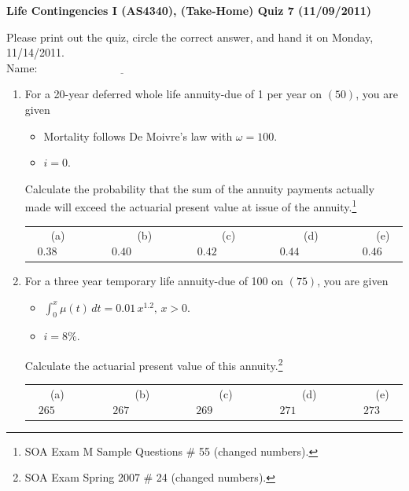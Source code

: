 \documentclass[11pt,fleqn,oneside]{book}
\begin{document}
\thispagestyle{empty}
\setcounter{page}{1}
\begin{center}
{ \large \bf Life Contingencies I (AS4340), (Take-Home) Quiz 7 (11/09/2011)}
\end{center}
\noindent
Please print out the quiz, circle the correct answer, and hand it on Monday, 11/14/2011.\\
Name: $\underline{\;\;\;\;\;\;\;\;\;\;\;\;\;\;\;\;\;\;\;\;\;\;\;\;\;\;\;\;\;\;\;\;\;\;\;\;\;\;\;\;\;\;\;\;\;\;\;\;\;\;\;\;\;}$
\begin{enumerate}

\item For a 20-year deferred whole life annuity-due of 1 per year on $(50)$, you are given
\begin{itemize}
\item Mortality follows De Moivre's law with $\omega = 100$.
\item $i=0$.
\end{itemize}
Calculate the probability that the sum of the annuity payments actually made will exceed the actuarial present value at issue of the annuity.\footnote[1]{SOA Exam M Sample Questions \# 55 (changed numbers).}

\begin{center}
\small
\begin{tabular}{c c c c c}
(a) $0.38\;\;\;\;\;\;\;$ & 
$\;\;\;\;\;\;\;$(b) $0.40\;\;\;\;\;\;\;\;$ &
$\;\;\;\;\;\;\;$(c) $0.42\;\;\;\;\;\;\;$ & 
$\;\;\;\;\;\;\;$(d) $0.44\;\;\;\;\;\;\;$ &
$\;\;\;\;\;\;\;$(e) $0.46$
\end{tabular}
\end{center}
\normalsize

\item For a three year temporary life annuity-due of 100 on $(75)$, you are given
\begin{itemize}
\item $\int_0^x\mu(t)\,dt = 0.01\,x^{1.2},\,x>0$.
\item $i=8\%$.
\end{itemize}
Calculate the actuarial present value of this annuity.\footnote[2]{SOA Exam Spring 2007 \# 24 (changed numbers).}

\begin{center}
\small
\begin{tabular}{c c c c c}
(a) $265\;\;\;\;\;\;\;$ & 
$\;\;\;\;\;\;\;$(b) $267\;\;\;\;\;\;\;$ &
$\;\;\;\;\;\;\;$(c) $269\;\;\;\;\;\;\;$ & 
$\;\;\;\;\;\;\;$(d) $271\;\;\;\;\;\;\;$ &
$\;\;\;\;\;\;\;$(e) $273$
\end{tabular}
\end{center}
\normalsize


\end{enumerate}
\end{document}
